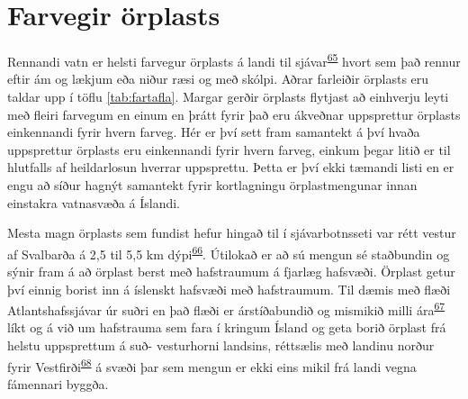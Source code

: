 \documentclass[icelandic,]{book}
\begin{document}
\hypertarget{farvegir-orplasts}{%
\chapter{Farvegir örplasts}\label{farvegir-orplasts}}

Rennandi vatn er helsti farvegur örplasts á landi til sjávar\textsuperscript{\protect\hyperlink{ref-unice2019characterizing1}{65}} hvort sem það rennur eftir ám og lækjum eða niður ræsi og með skólpi. Aðrar farleiðir örplasts eru taldar upp í töflu \ref{tab:fartafla}. Margar gerðir örplasts flytjast að einhverju leyti með fleiri farvegum en einum en þrátt fyrir það eru ákveðnar uppsprettur örplasts einkennandi fyrir hvern farveg. Hér er því sett fram samantekt á því hvaða uppsprettur örplasts eru einkennandi fyrir hvern farveg, einkum þegar litið er til hlutfalls af heildarlosun hverrar uppsprettu. Þetta er því ekki tæmandi listi en er engu að síður hagnýt samantekt fyrir kortlagningu örplastmengunar innan einstakra vatnasvæða á Íslandi.

Mesta magn örplasts sem fundist hefur hingað til í sjávarbotnsseti var rétt vestur af Svalbarða á 2,5 til 5,5 km dýpi\textsuperscript{\protect\hyperlink{ref-Bergmann2017}{66}}. Útilokað er að sú mengun sé staðbundin og sýnir fram á að örplast berst með hafstraumum á fjarlæg hafsvæði. Örplast getur því einnig borist inn á íslenskt hafsvæði með hafstraumum. Til dæmis með flæði Atlantshafssjávar úr suðri en það flæði er árstíðabundið og mismikið milli ára\textsuperscript{\protect\hyperlink{ref-Strait2005a}{67}} líkt og á við um hafstrauma sem fara í kringum Ísland og geta borið örplast frá helstu uppsprettum á suð- vesturhorni landsins, réttsælis með landinu norður fyrir Vestfirði\textsuperscript{\protect\hyperlink{ref-Astthorsson1994}{68}} á svæði þar sem mengun er ekki eins mikil frá landi vegna fámennari byggða.
\end{document}
